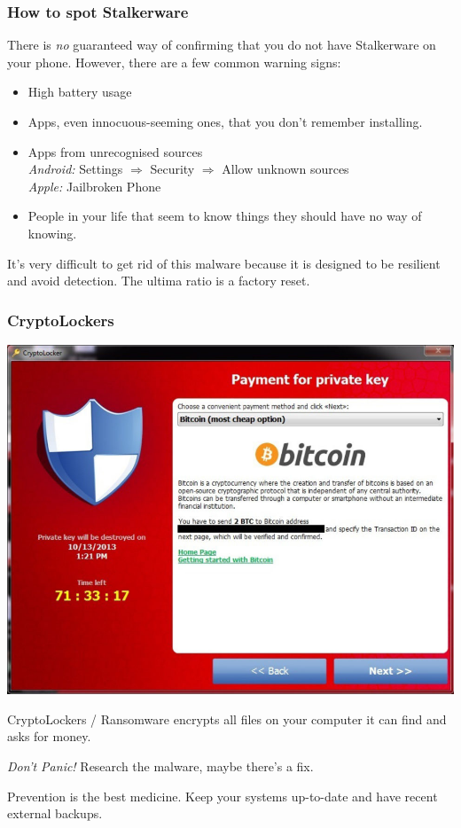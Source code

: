 \documentclass[aspectratio=1610,dvipsnames]{beamer}
\begin{document}
\begin{frame}
\frametitle{How to spot Stalkerware}

There is \emph{no} guaranteed way of confirming that you do not have Stalkerware on your phone. However, there are a few common warning signs:
\bigskip

\begin{itemize}
\pause\item High battery usage
\pause\item Apps, even innocuous-seeming ones, that you don't remember installing.
\pause\item Apps from unrecognised sources\\ \emph{Android:} Settings $\Rightarrow$ Security $\Rightarrow$ Allow unknown sources\\ \emph{Apple:} Jailbroken Phone
\pause\item People in your life that seem to know things they should have no way of knowing.
\end{itemize}
\pause\bigskip

It's very difficult to get rid of this malware because it is designed to be resilient and avoid detection. The ultima ratio is a factory reset.
\end{frame}


\begin{frame}
\frametitle{CryptoLockers}
\begin{minipage}{0.6\textwidth}
\begin{center}
\includegraphics[scale=0.2]{images/cryptolocker.jpg} 
\end{center}
\end{minipage}%
\begin{minipage}{0.4\textwidth}
CryptoLockers / Ransomware encrypts all files on your computer it can find and asks for money.
\pause\medskip

\emph{Don't Panic!} Research the malware, maybe there's a fix.
\pause\medskip

Prevention is the best medicine. Keep your systems up-to-date and have recent external backups.
\end{minipage}
\end{frame}
\end{document}
